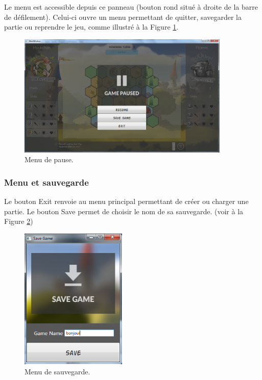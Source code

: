 \documentclass[a4paper]{article}
\begin{document}
		Le menu est accessible depuis ce panneau (bouton rond situé à droite de la barre de défilement). Celui-ci ouvre un menu permettant de quitter, savegarder la partie ou reprendre le jeu, comme illustré à la Figure \ref{fig:menu}.
		\begin{figure}[h!]
			\centering
			\includegraphics[width=0.9\textwidth]{../../IHM/menu.png}
			\caption{Menu de pause.}
			\label{fig:menu}
		\end{figure}

		\subsubsection{Menu et sauvegarde}
		Le bouton \og Exit \fg{} renvoie au menu principal permettant de créer ou charger une partie. Le bouton \og Save \fg{} permet de choisir le nom de sa sauvegarde. (voir à la Figure \ref{fig:save})
		\begin{figure}[h!]
			\centering
			\includegraphics[width=0.45\textwidth]{../../IHM/save.png}
			\caption{Menu de sauvegarde.}
			\label{fig:save}
		\end{figure}
\end{document}
